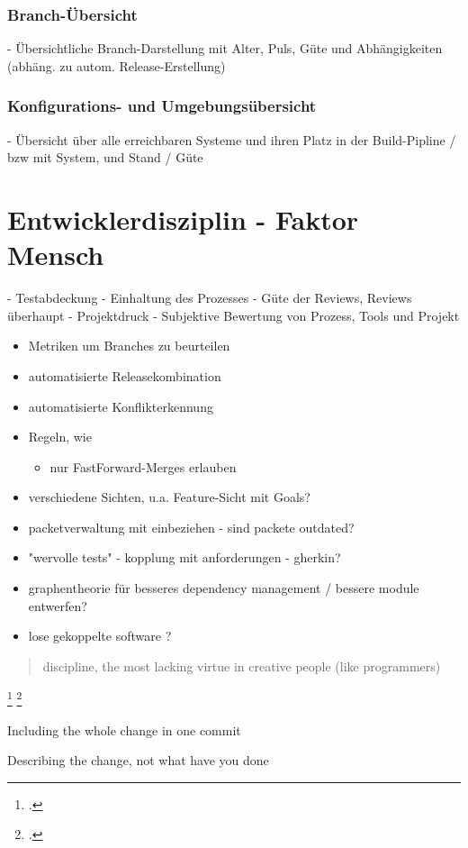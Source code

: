 \subsubsection{Branch-Übersicht}
- Übersichtliche Branch-Darstellung mit Alter, Puls, Güte und Abhängigkeiten (abhäng. zu autom. Release-Erstellung)
\subsubsection{Konfigurations- und Umgebungsübersicht}
- Übersicht über alle erreichbaren Systeme und ihren Platz in der Build-Pipline / bzw mit System, und Stand / Güte
\section{Entwicklerdisziplin - Faktor Mensch}
\label{sec:human-fail}
- Testabdeckung
- Einhaltung des Prozesses
- Güte der Reviews, Reviews überhaupt
- Projektdruck
- Subjektive Bewertung von Prozess, Tools und Projekt

\begin{itemize}
\item Metriken um Branches zu beurteilen
\item automatisierte Releasekombination
\item automatisierte Konflikterkennung
\item Regeln, wie 
	\begin{itemize}
		\item nur FastForward-Merges erlauben
	\end{itemize}	 
\item verschiedene Sichten, u.a. Feature-Sicht mit Goals?
\item packetverwaltung mit einbeziehen - sind packete outdated?
\item "wervolle tests" - kopplung mit anforderungen - gherkin?
\item graphentheorie für besseres dependency management / bessere module entwerfen?
\item lose gekoppelte software ?
\end{itemize}

\blockquote {discipline, the most lacking virtue in creative people (like programmers)}
\footcite[Making only one change per commit][]{git-essentials-2017}
\footcite[Writing commit messages before starting to code][]{git-essentials-2017}

Including the whole change in one commit

Describing the change, not what have you done



